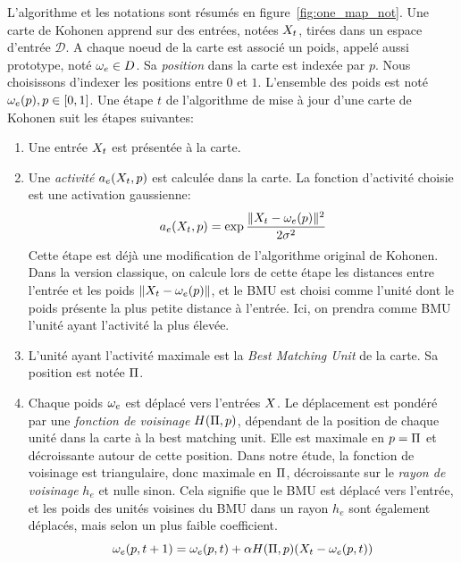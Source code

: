 L'algorithme et les notations sont résumés en figure~\ref{fig:one_map_not}. Une carte de Kohonen apprend sur des entrées, notées $X_t$, tirées dans un espace d'entrée $\mathcal{D}$. A chaque noeud de la carte est associé un poids, appelé aussi prototype, noté $\omega_e \in D$. Sa \emph{position} dans la carte est indexée par $p$. Nous choisissons d'indexer les positions entre $0$ et $1$. L'ensemble des poids est noté ${\omega_e(p), p \in [0,1]}$.
Une étape $t$ de l'algorithme de mise à jour d'une carte de Kohonen suit les étapes suivantes:
\begin{enumerate}
\item\label{enum:inp} Une entrée $X_t$ est présentée à la carte.
\item\label{enum:act} Une \emph{activité} $a_e(X_t,p)$ est calculée dans la carte. La fonction d'activité choisie est une activation gaussienne:
\begin{equation}\label{eq:act1som}
a_e(X_t,p) = \exp{\frac{\lVert X_t-\omega_{e}(p) \rVert ^2}{2\sigma^2}}
\end{equation}
Cette étape est déjà une modification de l'algorithme original de Kohonen.
Dans la version classique, on calcule lors de cette étape les distances entre l'entrée et les poids $\lVert X_t - \omega_e(p) \rVert$, et le BMU est choisi comme l'unité dont le poids présente la plus petite distance à l'entrée. 
Ici, on prendra comme BMU l'unité ayant l'activité la plus élevée.
\item\label{enum:bmu} L'unité ayant l'activité maximale est la \emph{Best Matching Unit} de la carte. Sa position est notée $\Pi$.
\item Chaque poids $\omega_e$ est déplacé vers l'entrées $X$. Le déplacement est pondéré par une \emph{fonction de voisinage} $H(\Pi,p)$, dépendant de la position de chaque unité dans la carte à la best matching unit. Elle est maximale en $p = \Pi$ et décroissante autour de cette position. Dans notre étude, la fonction de voisinage est triangulaire, donc maximale en $\Pi$, décroissante sur le \emph{rayon de voisinage} $h_e$ et nulle sinon. Cela signifie que le BMU est déplacé vers l'entrée, et les poids des unités voisines du BMU dans un rayon $h_e$ sont également déplacés, mais selon un plus faible coefficient.
\begin{equation}
\omega_e(p,t+1) = \omega_e(p,t) + \alpha H(\Pi,p)(X_t - \omega_e(p,t))
\label{eq:update}
\end{equation}
\end{enumerate}


